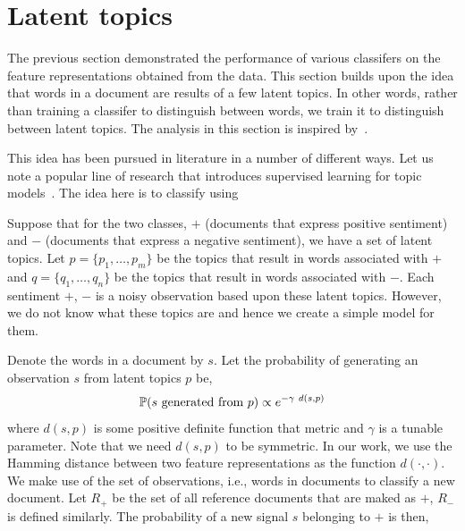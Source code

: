 \documentclass[11pt, letterpaper, conference, final, twocolumn]{ieeeconf}
\begin{document}
\section{Latent topics}
\label{sec:latent}

The previous section demonstrated the performance of various classifers on the feature representations obtained from the data. This section builds upon the idea that words in a document are results of a few latent topics. In other words, rather than training a classifer to distinguish between words, we train it to distinguish between latent topics. The analysis in this section is inspired by~\cite{nikolov2012nonparametric}.

This idea has been pursued in literature in a number of different ways. Let us note a popular line of research that introduces supervised learning for topic models~\cite{blei2010supervised}. The idea here is to classify using 

Suppose that for the two classes, $+$ (documents that express positive sentiment) and $-$ (documents that express a negative sentiment), we have a set of latent topics. Let $p = \{ p_1, \ldots, p_m \}$ be the topics that result in words associated with $+$ and $q = \{ q_1, \ldots, q_n \}$ be the topics that result in words associated with $-$. Each sentiment $+$, $-$ is a noisy observation based upon these latent topics. However, we do not know what these topics are and hence we create a simple model for them.

Denote the words in a document by $s$. Let the probability of generating an observation $s$ from latent topics $p$ be,
$$
\mathbb{P}(s\ \textrm{generated from}\ p) \propto e^{-\gamma\ d(s, p)}
$$
where $d(s,p)$ is some positive definite function that metric and $\gamma$ is a tunable parameter. Note that we need $d(s,p)$ to be symmetric. In our work, we use the Hamming distance between two feature representations as the function $d(\cdot, \cdot)$. We make use of the set of observations, i.e., words in documents to classify a new document. Let $R_+$ be the set of all reference documents that are maked as $+$, $R_-$ is defined similarly. The probability of a new signal $s$ belonging to $+$ is then,
\end{document}
